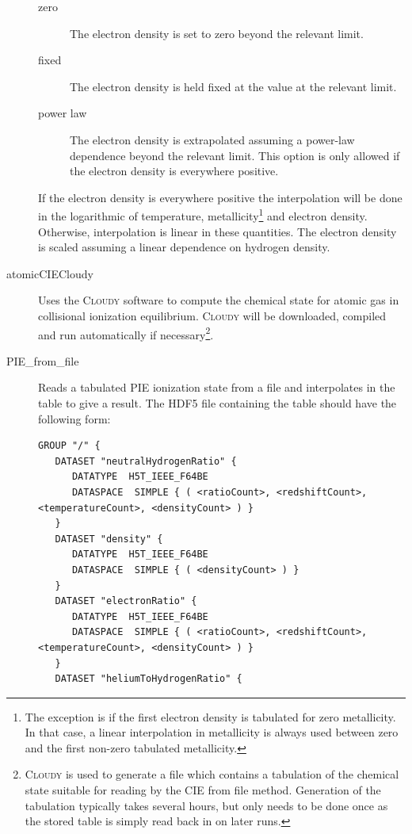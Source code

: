 \begin{description}
 \begin{description}
  \item[{\normalfont \ttfamily zero}] The electron density is set to zero beyond the relevant limit.
  \item[{\normalfont \ttfamily fixed}] The electron density is held fixed at the value at the relevant limit.
  \item[{\normalfont \ttfamily power law}] The electron density is extrapolated assuming a power-law dependence beyond the relevant limit. This option is only allowed if the electron density is everywhere positive.
 \end{description}
 If the electron density is everywhere positive the interpolation will be done in the logarithmic of temperature, metallicity\footnote{The exception is if the first electron density is tabulated for zero metallicity. In that case, a linear interpolation in metallicity is always used between zero and the first non-zero tabulated metallicity.} and electron density. Otherwise, interpolation is linear in these quantities. The electron density is scaled assuming a linear dependence on hydrogen density.
 \item [{\normalfont \ttfamily atomicCIECloudy}] Uses the {\normalfont \scshape Cloudy} software to compute the chemical state for atomic gas in collisional ionization equilibrium. {\normalfont \scshape Cloudy} will be downloaded, compiled and run automatically if necessary\footnote{{\normalfont \scshape Cloudy} is used to generate a file which contains a tabulation of the chemical state suitable for reading by the {\normalfont \ttfamily CIE from file} method. Generation of the tabulation typically takes several hours, but only needs to be done once as the stored table is simply read back in on later runs.}.
 \item [{\normalfont \ttfamily PIE\_from\_file}]  Reads a tabulated PIE ionization state from a file and interpolates in the table to give a result. The HDF5 file containing the table should have the following form:
\begin{verbatim}
GROUP "/" {
   DATASET "neutralHydrogenRatio" {
      DATATYPE  H5T_IEEE_F64BE
      DATASPACE  SIMPLE { ( <ratioCount>, <redshiftCount>, <temperatureCount>, <densityCount> ) }
   }
   DATASET "density" {
      DATATYPE  H5T_IEEE_F64BE
      DATASPACE  SIMPLE { ( <densityCount> ) }
   }
   DATASET "electronRatio" {
      DATATYPE  H5T_IEEE_F64BE
      DATASPACE  SIMPLE { ( <ratioCount>, <redshiftCount>, <temperatureCount>, <densityCount> ) }
   }
   DATASET "heliumToHydrogenRatio" {

\end{verbatim}
\end{description}
